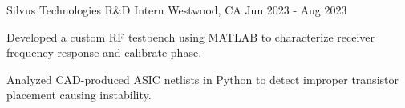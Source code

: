  \begin{cventry}
    {Silvus Technologies} %
    {R\&D Intern} %
    {Westwood, CA} %
    {Jun 2023 - Aug 2023} %
    {
      \begin{cvitems} %
        \item {
        Developed a custom RF testbench using MATLAB to characterize receiver frequency response
        and calibrate phase.
        }
        \item {
        Analyzed CAD-produced ASIC netlists in Python to detect improper transistor placement causing instability.
        }
      \end{cvitems}
    }
  \end{cventry}
